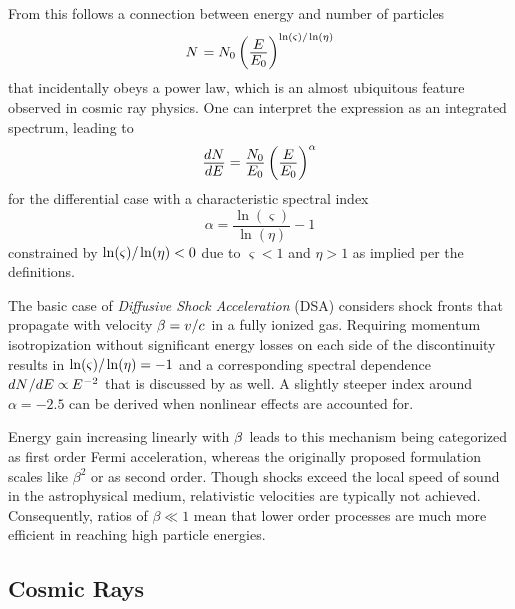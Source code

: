 \begin{spacing}{0.990}
	From this follows a connection between energy and number of particles
	\begin{equation}
		N \kern+0.9pt = N_0 \left( \frac{\raisebox{-0.3ex}{$E$}}{\raisebox{0.3ex}{$E_0$}} \right)^{\ln(\varsigma) / \kern-0.5pt \ln(\eta)}
	\end{equation}
	that incidentally obeys a power law, which is an almost ubiquitous feature
	observed in cosmic ray physics. One can interpret the expression as an integrated spectrum, leading to
	\begin{equation}
		\frac{\raisebox{-0.3ex}{$dN$}}{\raisebox{0.3ex}{$dE$}} = \frac{\raisebox{-0.3ex}{$N_0$}}{\raisebox{0.3ex}{$E_0$}}
		\left( \frac{\raisebox{-0.3ex}{$E$}}{\raisebox{0.3ex}{$E_0$}} \right)^\alpha
	\end{equation}
	for the differential case with a characteristic spectral index
	\begin{equation}
		\alpha = \frac{\ln(\varsigma)}{\ln(\eta)} - 1
	\end{equation}
	constrained by $\ln(\varsigma) / \kern-0.5pt \ln(\eta) < 0$ due to $\varsigma < 1$ and $\eta > 1$ as implied per the definitions.
	
	The basic case of \emph{Diffusive Shock Acceleration} (DSA) considers shock fronts that propagate with velocity
	$\kern-0.5pt \beta = v / c \kern+1.0pt$ in a fully ionized gas. Requiring momentum isotropization without significant energy losses
	on each side of the discontinuity results in $\ln(\varsigma) / \kern-0.5pt \ln(\eta) = -1$ and a corresponding spectral dependence
	$dN \kern+0.5pt / dE \propto \kern-0.5pt E^{\kern+0.5pt -2}$ that is discussed by \cite{Longair_2011} as well. A slightly steeper
	index around $\alpha = \num{-2.5}$ can be derived when nonlinear effects are accounted for.
	
	Energy gain increasing linearly with $\kern-0.5pt \beta \kern+1.0pt$ leads to this mechanism being categorized as first order Fermi
	acceleration, whereas the originally proposed formulation scales like $\beta^2$ or as second order. Though shocks exceed the local
	speed of sound in the astrophysical medium, relativistic velocities are typically not achieved. Consequently, ratios of $\beta \ll 1$
	mean that lower order processes are much more efficient in reaching high particle energies.


	\enlargethispage*{2\baselineskip}


	\subsection{Cosmic Rays}
	\label{sub:rays}
	

\end{spacing}
